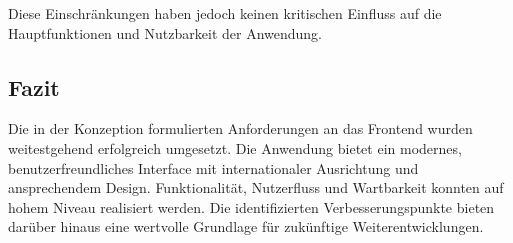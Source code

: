 Diese Einschränkungen haben jedoch keinen kritischen Einfluss auf die Hauptfunktionen und Nutzbarkeit der Anwendung.

\subsection*{Fazit}

Die in der Konzeption formulierten Anforderungen an das Frontend wurden weitestgehend erfolgreich umgesetzt. Die Anwendung bietet ein modernes, benutzerfreundliches Interface mit internationaler Ausrichtung und ansprechendem Design. Funktionalität, Nutzerfluss und Wartbarkeit konnten auf hohem Niveau realisiert werden. Die identifizierten Verbesserungspunkte bieten darüber hinaus eine wertvolle Grundlage für zukünftige Weiterentwicklungen.